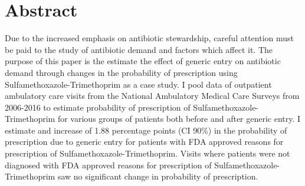 \chapter*{Abstract}
Due to the increased emphasis on antibiotic stewardship, careful attention must be paid to the study of antibiotic demand and factors which affect it. The purpose of this paper is the estimate the effect of generic entry on antibiotic demand through changes in the probability of prescription using Sulfamethoxazole-Trimethoprim as a case study. I pool data of outpatient ambulatory care visits from the National Ambulatory Medical Care Surveys from 2006-2016 to estimate probability of prescription of Sulfamethoxazole-Trimethoprim for various groups of patients both before and after generic entry. I estimate and increase of 1.88 percentage points (CI 90\%) in the probability of prescription due to generic entry for patients with FDA approved reasons for prescription of Sulfamethoxazole-Trimethoprim. Visits where patients were not diagnosed with FDA approved reasons for prescription of Sulfamethoxazole-Trimethoprim saw no significant change in probability of prescription.